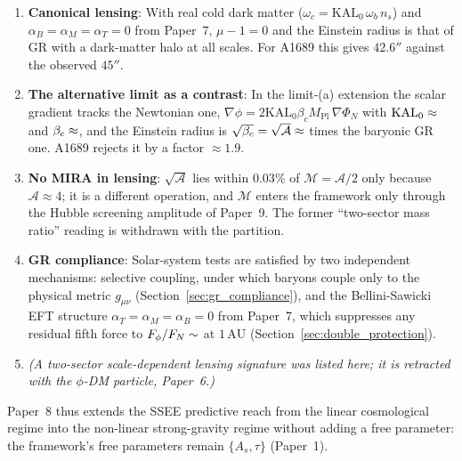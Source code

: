 \documentclass[12pt,a4paper]{article}
\newcommand{\KAL}{\mathrm{KAL}_0}
\newcommand{\MIRA}{\mathcal{M}}
\newcommand{\AURA}{\mathcal{A}}
\newcommand{\Mpl}{M_{\mathrm{Pl}}}
\newcommand{\bc}{\beta_c}
\newcommand{\alphaT}{\alpha_T}
\newcommand{\alphaM}{\alpha_M}
\begin{document}
\begin{enumerate}
  \item \textbf{Canonical lensing}: With real cold dark matter
        ($\omega_c=\KAL\,\omega_b\,n_s$) and $\alpha_B=\alpha_M=\alpha_T=0$ from
        Paper~7, $\mu-1=0$ and the Einstein radius is that of GR with a
        dark-matter halo at all scales. For A1689 this gives $42.6''$ against
        the observed $45''$.

  \item \textbf{The alternative limit as a contrast}: In the limit-(a)
        extension the scalar gradient tracks the Newtonian one,
        $\nabla\phi = 2\KAL\bc\Mpl\,\nabla\Phi_N$ with $\KAL \approx \val{KAL0_d3}$ and
        $\bc \approx \val{AURA_d3}$, and the Einstein radius is
        $\sqrt{\bc}=\sqrt{\AURA}\approx\val{sqrt_AURA_d4}$ times the baryonic GR one.
        A1689 rejects it by a factor $\approx 1.9$.

  \item \textbf{No MIRA in lensing}: $\sqrt{\AURA}$ lies within $0.03\%$ of
        $\MIRA = \AURA/2$ only because $\AURA\approx4$; it is a different
        operation, and $\MIRA$ enters the framework only through the Hubble
        screening amplitude of Paper~9. The former ``two-sector mass ratio''
        reading is withdrawn with the partition.

  \item \textbf{GR compliance}: Solar-system tests are satisfied by two
        independent mechanisms: selective coupling, under which baryons
        couple only to the physical metric $g_{\mu\nu}$
        (Section~\ref{sec:gr_compliance}), and the Bellini-Sawicki EFT
        structure $\alphaT = \alphaM = \alpha_B = 0$ from Paper~7, which
        suppresses any residual fifth force to $F_\phi/F_N \sim \val{quinta_fuerza_AU}$
        at $1\,\mathrm{AU}$ (Section~\ref{sec:double_protection}).

  \item \emph{(A two-sector scale-dependent lensing signature was listed here;
        it is retracted with the $\phi$-DM particle, Paper~6.)}
\end{enumerate}

Paper~8 thus extends the SSEE predictive reach from the linear cosmological
regime into the non-linear strong-gravity regime without adding a free
parameter: the framework's free parameters remain $\{A_s,\tau\}$ (Paper~1).
\end{document}
